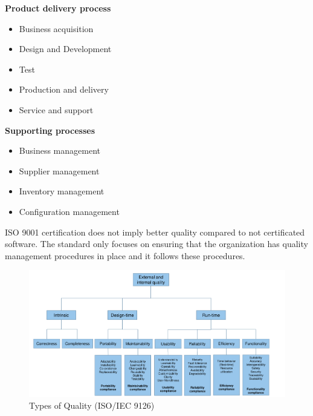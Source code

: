 \begin{minipage}[t]{0.49\textwidth}
    \textbf{Product delivery process}
    \begin{itemize}[topsep=0pt, itemsep=0pt]
        \item Business acquisition
        \item Design and Development
        \item Test
        \item Production and delivery
        \item Service and support
    \end{itemize}
\end{minipage}
\begin{minipage}[t]{0.49\textwidth}
    \textbf{Supporting processes}
    \begin{itemize}[topsep=0pt, itemsep=0pt]
        \item Business management
        \item Supplier management
        \item Inventory management
        \item Configuration management
    \end{itemize}
\end{minipage}
\newline

ISO 9001 certification does not imply better quality compared to not certificated software.
The standard only focuses on ensuring that the organization has quality management procedures in place and it follows these procedures.

\begin{figure}[H]
    \centering
    \includegraphics[width=\linewidth]{images/types_of_quality.png}
    \caption{Types of Quality (ISO/IEC 9126)}\label{fig:se_types_of_quality}
\end{figure}
